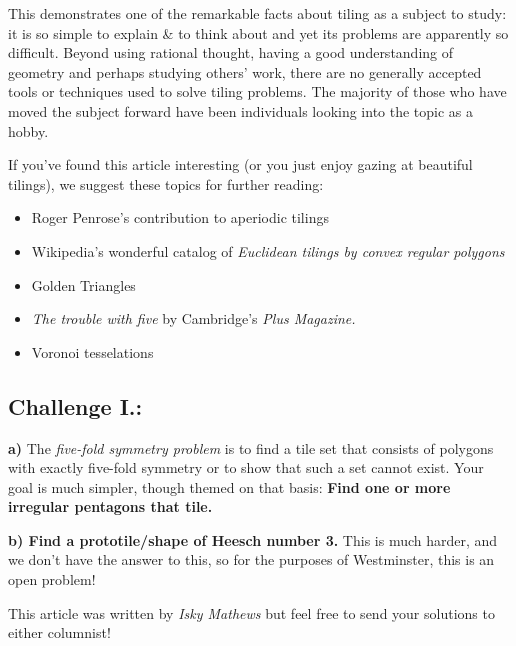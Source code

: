 This demonstrates one of the remarkable facts about tiling as a subject
to study: it is so simple to explain \& to think about and yet its
problems are apparently so difficult. Beyond using rational thought,
having a good understanding of geometry and perhaps studying others'
work, there are no generally accepted tools or techniques used to solve
tiling problems. The majority of those who have moved the subject
forward have been individuals looking into the topic as a hobby.

If you've found this article interesting (or you just enjoy gazing at
beautiful tilings), we suggest these topics for further reading:

\begin{itemize}
\item
  Roger Penrose's contribution to aperiodic tilings
\item
  Wikipedia's wonderful catalog of \emph{Euclidean tilings by convex
  regular polygons}
\item
  Golden Triangles
\item
  \emph{The trouble with five} by Cambridge's \emph{Plus Magazine.}
\item
  Voronoi tesselations
\end{itemize}

\subsection{Challenge I.:}\label{challenge-i.}

\textbf{a)} The \emph{five-fold symmetry problem} is to find a tile set
that consists of polygons with exactly five-fold symmetry or to show
that such a set cannot exist. Your goal is much simpler, though themed
on that basis: \textbf{Find one or more irregular pentagons that tile.}

\textbf{b) Find a prototile/shape of Heesch number 3.} This is much
harder, and we don't have the answer to this, so for the purposes of
Westminster, this is an open problem!

This article was written by \emph{Isky Mathews} but feel free to send
your solutions to either columnist!
